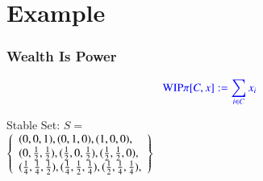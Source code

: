 \documentclass{beamer}
\def\mcolor#1#2{\rule{0ex}{0ex}\color{#1}#2\color{black}{}}
\begin{document}
\section{Example}
\begin{frame}
  \frametitle{Wealth Is Power}
\begin{minipage}{0.5\textwidth}
\[\mcolor{blue}{\text{WIP}\pi[C,x]:=\sum _{i\in C} x_i}\]
\end{minipage}\pause
\begin{minipage}{0.45\textwidth}
  \begin{center}
  
  \end{center}
\end{minipage}\pause

\vspace*{-1cm}
\begin{minipage}[b]{0.45\textwidth}
Stable Set: $S=$ \\$\left\{\begin{array}{ll}(0,0,1),(0,1,0),(1,0,0),\\(0,{1\over 2},{1\over 2}),({1\over 2},0,{1\over 2}),({1\over 2},{1\over 2},0),\\
({1\over 4},{1\over 4},{1\over 2}),({1\over 4},{1\over 2},{1\over 4}),({1\over 2},{1\over 4},{1\over 4}), \end{array}\right\}$
\end{minipage}

\end{frame}
\end{document}
